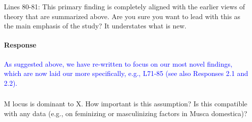 \documentclass[10pt,letterpaper]{article}
\begin{document}
\noindent\subsubsection{}
Lines 80-81: This primary finding is completely aligned with the earlier views of theory that are summarized above. Are you sure you want to lead with this as the main emphasis of the study? It understates what is new.

\noindent\paragraph{Response}
\textcolor{blue}{
As suggested above, we have re-written to focus on our most novel findings, which are now laid our more specifically, e.g., L71-85 (see also Responses 2.1 and 2.2). 
}

\noindent\subsubsection{}
M locus is dominant to X. How important is this assumption? Is this compatible with any data (e.g., on feminizing or masculinizing factors in Musca domestica)?
\end{document}
